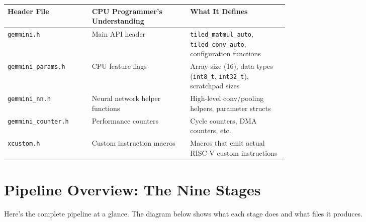 \documentclass[12pt,a4paper]{article}
\begin{document}
\begin{table}[H]
\centering
\small
\begin{tabularx}{\linewidth}{@{}L{0.30\linewidth}L{0.35\linewidth}Y@{}}
\toprule
\textbf{Header File} & \textbf{CPU Programmer's Understanding} & \textbf{What It Defines} \\
\midrule
\texttt{gemmini.h} & Main API header & \texttt{tiled\_matmul\_auto}, \texttt{tiled\_conv\_auto}, configuration functions \\
\texttt{gemmini\_params.h} & CPU feature flags & Array size (16), data types (\texttt{int8\_t}, \texttt{int32\_t}), scratchpad sizes \\
\texttt{gemmini\_nn.h} & Neural network helper functions & High-level conv/pooling helpers, parameter structs \\
\texttt{gemmini\_counter.h} & Performance counters & Cycle counters, DMA counters, etc. \\
\texttt{xcustom.h} & Custom instruction macros & Macros that emit actual RISC-V custom instructions \\
\bottomrule
\end{tabularx}
\end{table}

\section{Pipeline Overview: The Nine Stages}

Here's the complete pipeline at a glance. The diagram below shows what each stage does and what files it produces.
\end{document}
